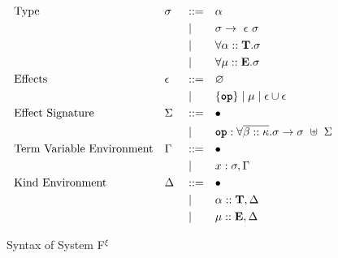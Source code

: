 \begin{figure}[h]
\begin{align*}
         & \text{Type}                      &  & \sigma   &  & ::=  &  & \alpha                                                                                               & \\
         &                                  &  &          &  & \mid &  & \sigma \rightarrow~\epsilon~\sigma                                                                   & \\
         &                                  &  &          &  & \mid &  & \forall \alpha :: \mathbf{T}. \sigma                                                          & \\
         &                                  &  &          &  & \mid &  & \forall \mu :: \mathbf{E}. \sigma                                                             & \\
         & \text{Effects}                   &  & \epsilon &  & ::=  &  & \varnothing                                                                                           & \\
         &                                  &  &          &  & \mid &  & \{\textbf{\texttt{op}}\}\mid\mu\mid\epsilon\cup\epsilon                                             & \\
         & \text{Effect Signature}          &  & \Sigma   &  & ::=  &  & \bullet                                                                                              & \\
         &                                  &  &          &  & \mid &  & \textbf{\texttt{op}}: \forall \overline{\beta :: \kappa}. \sigma \rightarrow \sigma ~\uplus~ \Sigma  & \\
         & \text{Term Variable Environment} &  & \Gamma   &  & ::=  &  & \bullet                                                                                              & \\
         &                                  &  &          &  & \mid &  & x: \sigma, \Gamma                                                                                    & \\
         & \text{Kind Environment}          &  & \Delta   &  & ::=  &  & \bullet                                                                                              & \\
         &                                  &  &          &  & \mid &  & \alpha::\mathbf{T},\Delta                                                                       & \\
         &                                  &  &          &  & \mid &  & \mu::\mathbf{E},\Delta
    \end{align*}
    \caption{Syntax of System F$^{\xi}$}
    \label{systemf:syntax}
\end{figure}
